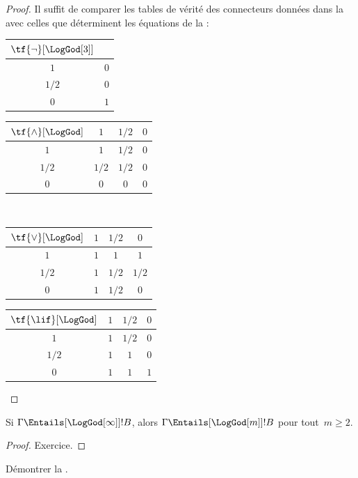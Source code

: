 \documentclass[../../../include/open-logic-section]{subfiles}
\begin{document}
\begin{proof}
  Il suffit de comparer les tables
  de vérité des connecteurs données
  dans la 
  avec celles que déterminent les
  équations de la
   :
  \begin{center}
    \begin{tabular}{c|c}
      $\tf{\lnot}[\LogGod[3]]$ & \\
      \hline
      $1$ & $0$ \\
      $1/2$ & $0$ \\
      $0$ & $1$
    \end{tabular}
    \quad
    \begin{tabular}{c|ccc}
      $\tf{\land}[\LogGod]$ & $1$ & $1/2$ & $0$ \\
      \hline
      $1$ & $1$ & $1/2$ & $0$ \\
      $1/2$ & $1/2$ & $1/2$ & $0$ \\
      $0$ & $0$ & $0$ & $0$
    \end{tabular}
    \\[2ex]
    \begin{tabular}{c|ccc}
      $\tf{\lor}[\LogGod]$ & $1$ & $1/2$ & $0$ \\
      \hline
      $1$ & $1$ & $1$ & $1$ \\
      $1/2$ & $1$ & $1/2$ & $1/2$ \\
      $0$ & $1$ & $1/2$ & $0$
    \end{tabular}
    \quad
    \begin{tabular}{c|ccc}
      $\tf{\lif}[\LogGod]$ & $1$ & $1/2$ & $0$ \\
      \hline
      $1$ & $1$ & $1/2$ & $0$ \\
      $1/2$ & $1$ & $1$ & $0$ \\
      $0$ & $1$ & $1$ & $1$
    \end{tabular}
  \end{center}
\end{proof}

\begin{prop}
  Si $\Gamma\Entails[\LogGod[\infty]] !B$,
  alors
  $\Gamma\Entails[\LogGod[m]] !B$
  pour tout~$m\ge2$.
\end{prop}

\begin{proof}
  Exercice.
\end{proof}

\begin{prob}
  Démontrer la
  .
\end{prob}
\end{document}
